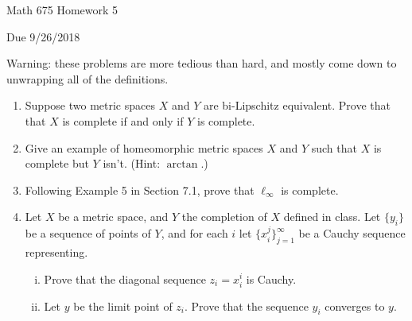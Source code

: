 \documentclass[12pt,letterpaper,reqno]{amsart}
\begin{document}
\thispagestyle{empty}
\centerline{\Large Math 675 Homework 5}
\centerline{Due 9/26/2018}
\vspace{.25in}
Warning: these problems are more tedious than hard, and mostly come down to unwrapping all of the definitions.

\begin{enumerate}[1.]
\item Suppose two metric spaces $X$ and $Y$ are bi-Lipschitz equivalent. Prove that that $X$ is complete if and only if $Y$ is complete.
\item Give an example of homeomorphic metric spaces $X$ and $Y$ such that $X$ is complete but $Y$ isn't. (Hint: $\arctan$.)
\item Following Example 5 in Section 7.1, prove that $\ell_\infty$ is complete.
\item Let $X$ be a metric space, and $Y$ the completion of $X$ defined in class. Let $\{y_i\}$ be a sequence of points of $Y$, and for each $i$ let $\{x_i^j\}_{j=1}^\infty$ be a Cauchy sequence representing. 
\begin{enumerate}[(i)]
\item  Prove that the diagonal sequence $z_i=x_i^i$ is Cauchy.
\item Let $y$ be the limit point of $z_i$. Prove that the sequence $y_i$ converges to $y$.
\end{enumerate}
\end{enumerate}
\end{document}
